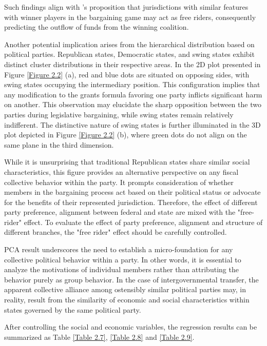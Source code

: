 Such findings align with \Textcite{martin2018dividing}'s proposition that jurisdictions with similar features with winner players in the bargaining game may act as free riders, consequently predicting the outflow of funds from the winning coalition.

Another potential implication arises from the hierarchical distribution based on political parties. Republican states, Democratic states, and swing states exhibit distinct cluster distributions in their respective areas. In the 2D plot presented in Figure \ref{Figure 2.2} (a), red and blue dots are situated on opposing sides, with swing states occupying the intermediary position. This configuration implies that any modification to the grants formula favoring one party inflicts significant harm on another. This observation may elucidate the sharp opposition between the two parties during legislative bargaining, while swing states remain relatively indifferent. The distinctive nature of swing states is further illuminated in the 3D plot depicted in Figure \ref{Figure 2.2} (b), where green dots do not align on the same plane in the third dimension.

While it is unsurprising that traditional Republican states share similar social characteristics, this figure provides an alternative perspective on any fiscal collective behavior within the party. It prompts consideration of whether members in the bargaining process act based on their political status or advocate for the benefits of their represented jurisdiction. Therefore, the effect of different party preference, alignment between federal and state are mixed with the "free-rider" effect. To evaluate the effect of party preference, alignment and structure of different branches, the "free rider" effect should be carefully controlled.

PCA result underscores the need to establish a micro-foundation for any collective political behavior within a party. In other words, it is essential to analyze the motivations of individual members rather than attributing the behavior purely as group behavior. In the case of intergovernmental transfer, the apparent collective alliance among ostensibly similar political parties may, in reality, result from the similarity of economic and social characteristics within states governed by the same political party.



After controlling the social and economic variables, the regression results can be summarized as Table \ref{Table 2.7}, \ref{Table 2.8} and \ref{Table 2.9}.

